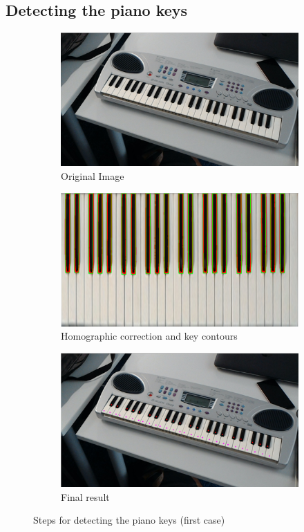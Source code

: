 \documentclass[12 pct]{report}
\begin{document}
\subsection *{Detecting the piano keys}

\begin{figure}[H]
  \centering
  \begin{subfigure}[b]{0.8\linewidth}
    \includegraphics[width=\linewidth]{piano-original}
     \caption{Original Image}
  \end{subfigure}
  \begin{subfigure}[b]{0.8\linewidth}
    \includegraphics[width=\linewidth]{piano-correction}
    \caption{Homographic correction and key contours}
  \end{subfigure}
  \begin{subfigure}[b]{0.8\linewidth}
    \includegraphics[width=\linewidth]{piano-points}
    \caption{Final result}
  \end{subfigure}
  \caption{Steps for detecting the piano keys (first case)}
  \label{fig:coffee3}
\end{figure}
\end{document}
